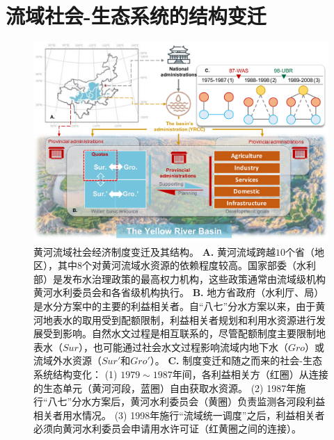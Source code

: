 
\section{流域社会-生态系统的结构变迁}\label{results-1}

\begin{figure}[!t]
	\includegraphics[width=\linewidth]{img/ch5/diagram.pdf}
	\caption[黄河流域社会经济制度变迁及其结构]{
		黄河流域社会经济制度变迁及其结构。
		\textbf{A.} 黄河流域跨越$10$个省（地区），其中$8$个对黄河流域水资源的依赖程度较高。国家部委（水利部）是发布水治理政策的最高权力机构，这些政策通常由流域级机构黄河水利委员会和各省级机构执行。
		\textbf{B.} 地方省政府（水利厅、局）是水分方案中的主要的利益相关者。自“八七”分水方案以来，由于黄河地表水的取用受到配额限制，利益相关者规划和利用水资源进行发展受到影响。自然水文过程是相互联系的，尽管配额制度主要限制地表水（$Sur$），也可能通过社会水文过程影响流域内地下水（$Gro$）或流域外水资源（$Sur'$和$Gro'$）。
		\textbf{C.} 制度变迁和随之而来的社会-生态系统结构变化：
		(1) $1979 \sim 1987$年间，各利益相关方（红圈）从连接的生态单元（黄河河段，蓝圈）自由获取水资源。
		(2) 1987年施行“八七”分水方案后，黄河水利委员会（黄圈）负责监测各河段利益相关者用水情况。
		(3) 1998年施行“流域统一调度”之后，利益相关者必须向黄河水利委员会申请用水许可证（红黄圈之间的连接）。}\label{fig:structure}
\end{figure}

